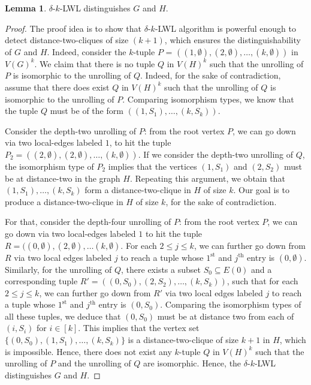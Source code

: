 \documentclass{article}
\theoremstyle{definition}
\newtheorem{lemma}[theorem]{Lemma}
\newcommand{\localkwl}{$\delta$-$k$-\textsf{LWL}\xspace}
\begin{document}
\begin{lemma}
	\localkwl distinguishes $G$ and $H$. 
\end{lemma} 
\begin{proof}
	The proof idea is to show that \localkwl algorithm is powerful enough to detect distance-two-cliques of size $(k+1)$, which ensures the distinguishability of $G$ and $H$. Indeed, consider the $k$-tuple $P$ = $( (1,\emptyset), (2,\emptyset) , \dots, (k,\emptyset))$ in $V(G)^k$. We claim that there is no tuple $Q$ in $V(H)^k$ such that the unrolling of $P$ is isomorphic to the unrolling of $Q$. Indeed, for the sake of contradiction, assume that there does exist $Q$ in $V(H)^k$ such that the unrolling of $Q$ is isomorphic to the unrolling of $P$. Comparing isomorphism types, we know that the tuple $Q$ must be of the form $((1,S_1), \dots, (k,S_k))$. 
	
	Consider the depth-two unrolling of $P$: from the root vertex $P$, we can go down via two local-edges labeled $1$, to hit the tuple $P_2=((2,\emptyset),(2,\emptyset), \dots, (k,\emptyset))$. If we consider the depth-two unrolling of $Q$, the isomorphism type of $P_2$ implies that the vertices $(1,S_1)$ and $(2,S_2)$ must be at distance-two in the graph $H$. Repeating this argument, we obtain that $(1,S_1), \dots,(k,S_k)$ form a distance-two-clique in $H$ of size $k$. Our goal is to produce a distance-two-clique in $H$ of size $k$, for the sake of contradiction. 
	
	For that, consider the depth-four unrolling of $P$: from the root vertex $P$, we can go down via two local-edges labeled $1$ to hit the tuple $R = ((0,\emptyset), (2,\emptyset), \dots (k,\emptyset)$. For each $2 \leq j \leq k$, we can further go down from $R$ via two local edges labeled $j$ to reach a tuple whose $1^{\text{st}}$ and $j^{\text{th}}$ entry is $(0,\emptyset)$. Similarly, for the unrolling of $Q$, there exists a subset $S_0 \subseteq E(0)$ and a corresponding tuple $R'=((0,S_0),(2,S_2),\dots, (k,S_k))$, such that for each $2 \leq j \leq k$, we can further go down from $R'$ via two local edges labeled $j$ to reach a tuple whose $1^{\text{st}}$ and $j^{\text{th}}$ entry is $(0,S_0)$. Comparing the isomorphism types of all these tuples, we deduce that $(0,S_0)$ must be at distance two from each of $(i,S_i)$ for $i \in [k]$. This implies that the vertex set $\{ (0,S_0),(1,S_1),\dots,(k,S_k)\}$ is a distance-two-clique of size $k+1$ in $H$, which is impossible. Hence, there does not exist any $k$-tuple $Q$ in $V(H)^k$ such that the unrolling of $P$ and the unrolling of $Q$ are isomorphic. Hence, the \localkwl distinguishes $G$ and $H$. 
\end{proof}
\end{document}
